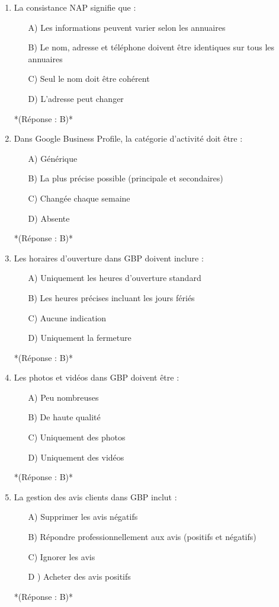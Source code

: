 \documentclass[12pt,a4paper,twoside]{report}
\begin{document}
\begin{enumerate}
\item La consistance NAP signifie que :
\begin{itemize}
\item[A)] Les informations peuvent varier selon les annuaires
\item[B)] Le nom, adresse et téléphone doivent être identiques sur tous les annuaires
\item[C)] Seul le nom doit être cohérent
\item[D)] L'adresse peut changer
\end{itemize}
*(Réponse : B)*

\item Dans Google Business Profile, la catégorie d'activité doit être :
\begin{itemize}
\item[A)] Générique
\item[B)] La plus précise possible (principale et secondaires)
\item[C)] Changée chaque semaine
\item[D)] Absente
\end{itemize}
*(Réponse : B)*

\item Les horaires d'ouverture dans GBP doivent inclure :
\begin{itemize}
\item[A)] Uniquement les heures d'ouverture standard
\item[B)] Les heures précises incluant les jours fériés
\item[C)] Aucune indication
\item[D)] Uniquement la fermeture
\end{itemize}
*(Réponse : B)*

\item Les photos et vidéos dans GBP doivent être :
\begin{itemize}
\item[A)] Peu nombreuses
\item[B)] De haute qualité
\item[C)] Uniquement des photos
\item[D)] Uniquement des vidéos
\end{itemize}
*(Réponse : B)*

\item La gestion des avis clients dans GBP inclut :
\begin{itemize}
\item[A)] Supprimer les avis négatifs
\item[B)] Répondre professionnellement aux avis (positifs et négatifs)
\item[C)] Ignorer les avis
\item[D]) Acheter des avis positifs
\end{itemize}
*(Réponse : B)*


\end{enumerate}
\end{document}
